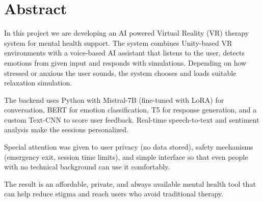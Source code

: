 \chapter*{Abstract}

In this project we are developing an AI powered Virtual Reality (VR) therapy system for mental health support. The system combines Unity-based VR environments with a voice-based AI assistant that listens to the user, detects emotions from given input and responds with simulations. Depending on how stressed or anxious the user sounds, the system chooses and loads suitable relaxation simulation.

The backend uses Python with Mistral-7B (fine-tuned with LoRA) for conversation, BERT for emotion classification, T5 for response generation, and a custom Text-CNN to score user feedback. Real-time speech-to-text and sentiment analysis make the sessions personalized.

Special attention was given to user privacy (no data stored), safety mechanisms (emergency exit,
session time limits), and simple interface so that even people with no technical background can
use it comfortably.

The result is an affordable, private, and always available mental health tool that can help reduce
stigma and reach users who avoid traditional therapy.

